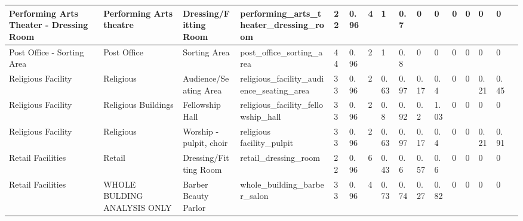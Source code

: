 \begin{center}
\begin{landscape}
\begin{longtable}{|p{0.75in}|p{0.75in}|p{0.75in}|p{0.75in}|p{0.3in}|p{0.3in}|p{0.3in}|p{0.3in}|p{0.3in}|p{0.3in}|p{0.3in}|p{0.3in}|p{0.3in}|p{0.3in}|p{0.3in}|p{0.6in}|}
      Performing Arts Theater - Dressing Room & Performing Arts theatre     & Dressing/Fitting Room                           & performing\_arts\_theater\_dressing\_room                       & 22   & 0.96 & 4  & 1      & 0.7   & 0     & 0     & 0    & 0    & 0    & 0    &                                                                                       \\ \hline
      Post Office - Sorting Area              & Post Office                 & Sorting Area                                    & post\_office\_sorting\_area                                     & 44   & 0.96 & 2  & 1      & 0.8   & 0     & 0     & 0    & 0    & 0    & 0    &                                                                                       \\ \hline
      Religious Facility                      & Religious                   & Audience/Seating Area                           & religious\_facility\_audience\_seating\_area                    & 33   & 0.96 & 2  & 0.63   & 0.97  & 0.17  & 0.4   & 0    & 0    & 0.21 & 0.45 &                                                                                       \\ \hline
      Religious Facility                      & Religious Buildings         & Fellowship Hall                                 & religious\_facility\_fellowship\_hall                           & 33   & 0.96 & 2  & 0.8    & 0.92  & 0.2   & 1.03  & 0    & 0    & 0    & 0    &                                                                                       \\ \hline
      Religious Facility                      & Religious                   & Worship - pulpit, choir                         & religious facility\_pulpit                                      & 33   & 0.96 & 2  & 0.63   & 0.97  & 0.17  & 0.4   & 0    & 0    & 0.21 & 0.91 &                                                                                       \\ \hline
      Retail Facilities                       & Retail                      & Dressing/Fitting Room                           & retail\_dressing\_room                                          & 22   & 0.96 & 6  & 0.43   & 0.6   & 0.57  & 0.6   & 0    & 0    & 0    & 0    &                                                                                       \\ \hline
      Retail Facilities                       & WHOLE BULDING ANALYSIS ONLY & Barber  Beauty Parlor                           & whole\_building\_barber\_salon                                  & 33   & 0.96 & 4  & 0.73   & 0.74  & 0.27  & 0.82  & 0    & 0    & 0    & 0    &                                                                                       \\ \hline

\end{longtable}
\end{landscape}
\end{center}
